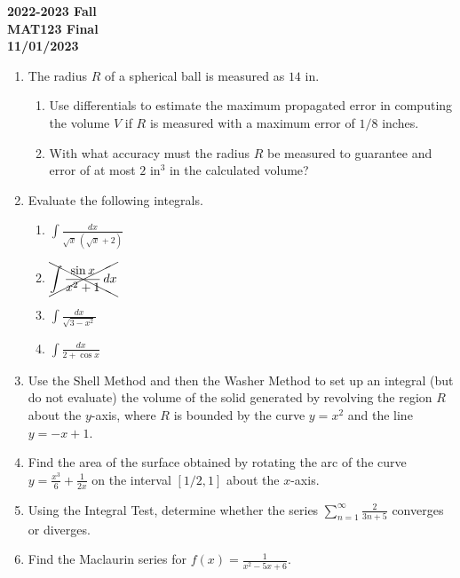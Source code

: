 \documentclass[a4paper, 12pt]{article}
\begin{document}
\begin{center}
\textbf{2022-2023 Fall\\MAT123 Final\\11/01/2023}
\end{center}

\begin{enumerate}[leftmargin=*,label=\textbf{\arabic*.}]
\item The radius $R$ of a spherical ball is measured as $14$ in.

\begin{enumerate}[leftmargin=*,label=\textbf{\alph*.}]
\item Use differentials to estimate the maximum propagated error in computing the volume $V$ if $R$ is measured with a maximum error of $1/8$ inches.

\item With what accuracy must the radius $R$ be measured to guarantee and error of at most $2$ in$^3$ in the calculated volume?
\end{enumerate}

\item Evaluate the following integrals.
\begin{enumerate}[leftmargin=*,label=\textbf{\alph*.}]
\item $\displaystyle\int\frac{dx}{\sqrt x\,\left(\sqrt x+2\right)}$
\item $\xcancel{\displaystyle\int\frac{\sin x}{x^2+1}\,dx}$
\item $\displaystyle\int\frac{dx}{\sqrt{3-x^2}}$
\item $\displaystyle\int\frac{dx}{2+\cos x}$
\end{enumerate}

\item Use the Shell Method and then the Washer Method to set up an integral (but do not evaluate) the volume of the solid generated by revolving the region $R$ about the $y$-axis, where $R$ is bounded by the curve $y=x^2$ and the line $y=-x+1$.

\item Find the area of the surface obtained by rotating the arc of the curve $\displaystyle y=\frac{x^3}6+\frac1{2x}$ on the interval $[1/2,1]$ about the $x$-axis.

\item Using the Integral Test, determine whether the series
$\displaystyle\sum_{n=1}^\infty\frac2{3n+5}$
converges or diverges.

\item Find the Maclaurin series for $\displaystyle f(x)=\frac1{x^2-5x+6}$.

\end{enumerate}
\end{document}
